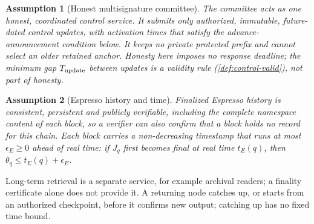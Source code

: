 \documentclass[11pt,a4paper]{article}
\newtheorem{assumption}[assumption]{Assumption}
\begin{document}
\begin{assumption}[Honest multisignature committee]
\label{ass:committee}
The committee acts as one honest, coordinated control service. It
submits only authorized, immutable, future-dated control updates, with
activation times that satisfy the advance-announcement condition below. It keeps no private protected prefix and cannot select
an older retained anchor. Honesty here imposes no response deadline; the
minimum gap $T_{\rm update}$ between updates is a validity rule
(\cref{def:control-valid}), not part of honesty.
\end{assumption}

\begin{assumption}[Espresso history and time]
\label{ass:espresso}
Finalized Espresso history is consistent, persistent and publicly
verifiable, including the complete namespace content of each block, so a
verifier can also confirm that a block holds no record for this chain.
Each block carries a non-decreasing timestamp that runs at most
$\epsilon_E\ge0$ ahead of real time: if $J_q$ first becomes final at real
time $t_E(q)$, then $\theta_q\le t_E(q)+\epsilon_E$.
\end{assumption}
Long-term retrieval is a separate service, for example archival readers;
a finality certificate alone does not provide it. A returning node
catches up, or starts from an authorized checkpoint, before it confirms
new output; catching up has no fixed time bound.
\end{document}

